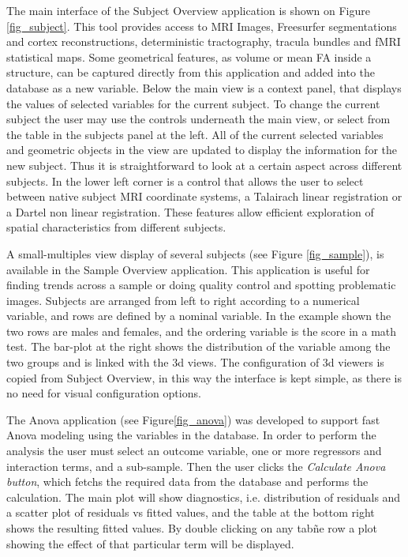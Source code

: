\documentclass[utf8,paper]{frontiersSCNS} %
\begin{document}
The main interface of the Subject Overview application is shown on Figure \ref{fig_subject}. This tool provides access to MRI Images, Freesurfer segmentations and cortex reconstructions, deterministic tractography, tracula bundles and fMRI statistical maps. Some geometrical features, as volume or mean FA inside a structure, can be captured directly from  this application and added into the database as a new variable. Below the main view  is a context panel, that displays the values of selected variables for the current subject. To change the current subject the user may use the controls underneath the main view, or select from the table in the subjects panel at the left. All of the current selected variables and geometric objects in the view are updated to display the information for the new subject. Thus it is straightforward to look at a certain aspect across different subjects. In the lower left corner is a control that allows the user to select between native subject MRI coordinate systems, a Talairach linear registration or a Dartel non linear registration. These features allow efficient exploration of spatial characteristics from different subjects.

A small-multiples view\citep{tufte_visual_1983} display of several subjects (see Figure \ref{fig_sample}), is available in the Sample Overview application. This application is useful for finding trends across a sample or doing quality control and spotting problematic images. Subjects are arranged from left to right according to a numerical variable, and rows are defined by a nominal variable. In the example shown the two rows are males and females, and the ordering variable is the score in a math test. The bar-plot at the right shows the distribution of the variable among the two groups and is linked with the 3d views. The configuration of 3d viewers is copied from Subject Overview, in this way the interface is kept simple, as there is no need for visual configuration options.

The Anova application (see Figure\ref{fig_anova}) was developed to support fast Anova modeling using the variables in the database. In order to perform the analysis the user must select an outcome variable, one or more regressors and interaction terms, and a sub-sample.  Then the user clicks the \emph{Calculate Anova button}, which fetchs the required data from the database and performs the calculation. The main plot will show diagnostics, i.e. distribution of residuals and a scatter plot of residuals vs fitted values, and the table at the bottom right shows the resulting fitted values. By double clicking on any tabñe row a plot showing the effect of that particular term will be displayed. 
\end{document}
